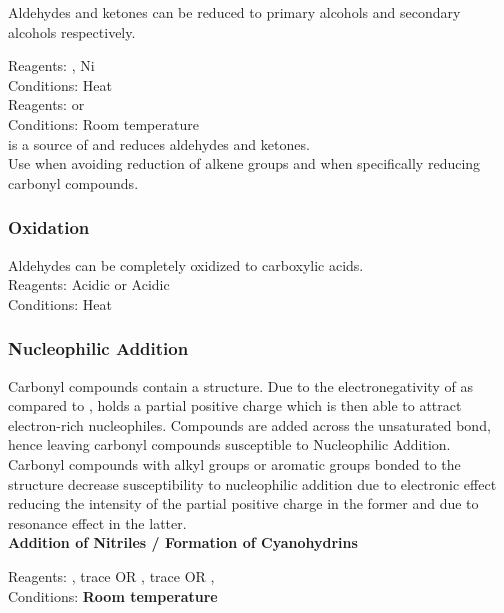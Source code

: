 \documentclass[../main]{subfiles}
\begin{document}
	Aldehydes and ketones can be reduced to primary alcohols and secondary alcohols respectively.

	Reagents: , Ni \\
	Conditions: Heat \\

	Reagents:  or \\
	Conditions: Room temperature \\

	 is a source of  and reduces aldehydes and ketones. \\

	Use  when avoiding reduction of alkene groups and  when specifically reducing carbonyl compounds. \\

	\subsubsection{Oxidation}

	Aldehydes can be completely oxidized to carboxylic acids. \\

	Reagents: Acidic  or Acidic  \\
	Conditions: Heat \\

	\subsubsection{Nucleophilic Addition}

	Carbonyl compounds contain a  structure. Due to the electronegativity of  as compared to ,  holds a partial positive charge which is then able to attract electron-rich nucleophiles. Compounds are added across the unsaturated  bond, hence leaving carbonyl compounds susceptible to Nucleophilic Addition. \\

	Carbonyl compounds with alkyl groups or aromatic groups bonded to the  structure decrease susceptibility to nucleophilic addition due to electronic effect reducing the intensity of the partial positive charge in the former and due to resonance effect in the latter. \\

	\noindent \textbf{Addition of Nitriles / Formation of Cyanohydrins}

	Reagents: , trace  OR , trace  OR ,  \\
	Conditions: \textbf{Room temperature} \\
\end{document}
